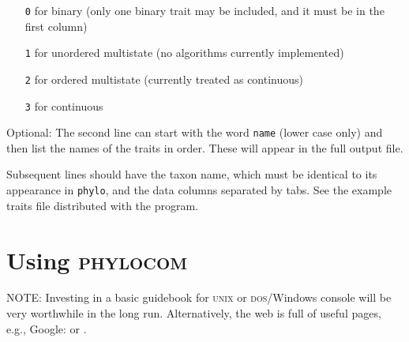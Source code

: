 \documentclass[12pt,letterpaper]{article}
\begin{document}
\begin{itemize}
\item[\texttt{0}] for binary (only one binary trait may be included, and it must be in the first column)
\item[\texttt{1}] for unordered multistate (no algorithms currently implemented)
\item[\texttt{2}] for ordered multistate (currently treated as continuous)
\item[\texttt{3}] for continuous
\end{itemize}

Optional: The second line can start with the word \verb|name| (lower case
only) and then list the names of the traits in order. These will
appear in the full output file.

Subsequent lines should have the taxon name, which must be identical
to its appearance in \verb|phylo|, and the data columns separated by
tabs. See the example traits file distributed with the program.

\section{Using {\scshape phylocom}}
\label{s:usingphylocom}

NOTE: Investing in a basic guidebook for {\scshape unix} or {\scshape
  dos}/Windows console will be very worthwhile in the long run.
Alternatively, the web is full of useful pages, e.g., Google:
 or
.
\end{document}
